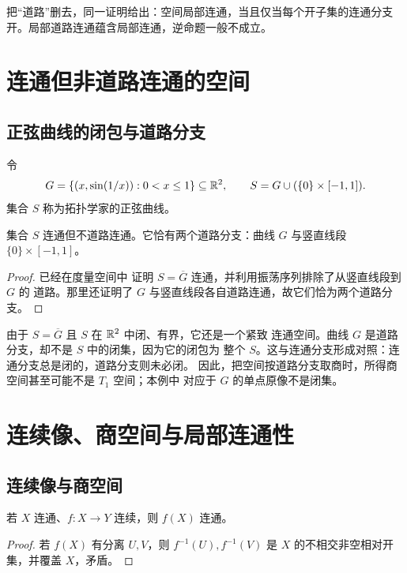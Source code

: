 把“道路”删去，同一证明给出：空间局部连通，当且仅当每个开子集的连通分支开。局部道路连通蕴含局部连通，逆命题一般不成立。

\section{连通但非道路连通的空间}

\subsection{正弦曲线的闭包与道路分支}

令
\[
 G=\{(x,\sin(1/x)):0<x\le1\}\subseteq\mathbb{R}^2,
\qquad
 S=G\cup(\{0\}\times[-1,1]).
\]
集合 \(S\) 称为拓扑学家的正弦曲线。

\begin{theorem}[拓扑学家的正弦曲线]
\label{thm:topologists-sine-curve}
集合 \(S\) 连通但不道路连通。它恰有两个道路分支：曲线 \(G\) 与竖直线段 \(\{0\}\times[-1,1]\)。
\end{theorem}

\begin{proof}
已经在度量空间中
证明 \(S=\overline G\) 连通，并利用振荡序列排除了从竖直线段到 \(G\) 的
道路。那里还证明了 \(G\) 与竖直线段各自道路连通，故它们恰为两个道路分支。
\end{proof}

由于 \(S=\overline G\) 且 \(S\) 在 \(\mathbb{R}^2\) 中闭、有界，它还是一个紧致
连通空间。曲线 \(G\) 是道路分支，却不是 \(S\) 中的闭集，因为它的闭包为
整个 \(S\)。这与连通分支形成对照：连通分支总是闭的，道路分支则未必闭。
因此，把空间按道路分支取商时，所得商空间甚至可能不是 \(T_1\) 空间；本例中
对应于 \(G\) 的单点原像不是闭集。

\section{连续像、商空间与局部连通性}

\subsection{连续像与商空间}

\begin{theorem}[连续像保持连通]
\label{thm:continuous-image-connected}
若 \(X\) 连通、\(f:X\to Y\) 连续，则 \(f(X)\) 连通。
\end{theorem}

\begin{proof}
若 \(f(X)\) 有分离 \(U,V\)，则 \(f^{-1}(U),f^{-1}(V)\) 是 \(X\) 的不相交非空相对开集，并覆盖 \(X\)，矛盾。
\end{proof}

